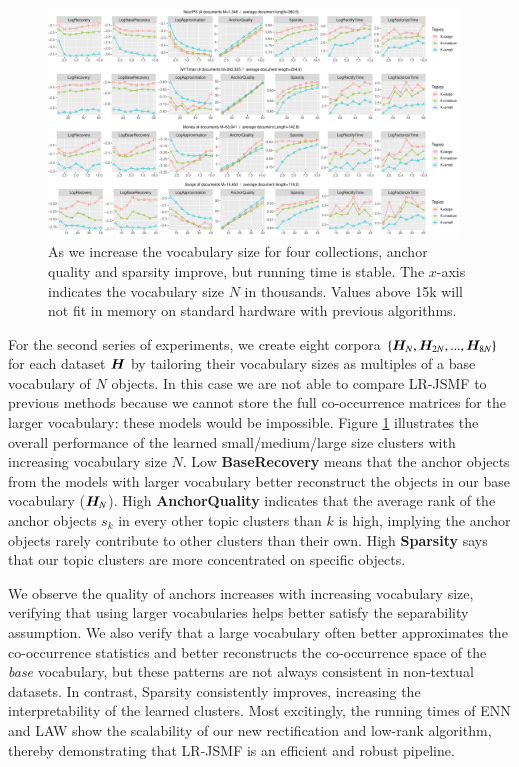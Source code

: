 \begin{figure}[ht]
 	\centering
	\includegraphics[width=0.97\textwidth, trim={1.0cm 1.0cm 1.0cm 0.0cm}]
	{./ch4/pics/real_TopicsPerVocabs_new-plain.pdf}
	\caption{As we increase the vocabulary size for four collections, anchor
	quality and sparsity improve, but running time is stable. The $x$-axis
	indicates the vocabulary size $N$ in thousands. Values above 15k will not fit
	in memory on standard hardware with previous algorithms.}
	\label{fig:results-vocabs}
\end{figure}

For the second series of experiments, 
we create eight corpora $\{\bm{H}_N, \bm{H}_{2N}, ..., \bm{H}_{8N}\}$ for each dataset
$\bm{H}$ by tailoring their vocabulary sizes as multiples of a base vocabulary of
$N$ objects. In this case we are not able to compare LR-JSMF to previous methods
because we cannot store the full co\hyp{}occurrence matrices for the larger
vocabulary: these models would be impossible. Figure \ref{fig:results-vocabs}
illustrates the overall performance of the learned small/medium/large size
clusters with increasing vocabulary size $N$. Low \textbf{BaseRecovery} means
that the anchor objects from the models with larger vocabulary better
reconstruct the objects in our base vocabulary ($\bm{H}_N$). High  
\textbf{AnchorQuality} indicates that the average rank of the anchor objects
$s_k$ in every other topic clusters than $k$ is high, implying the anchor
objects rarely contribute to other clusters than their own. High 
\textbf{Sparsity}  \cite{Hoyer2004} says that our topic clusters are more concentrated on specific objects.

We observe the quality of anchors increases with increasing vocabulary size,
verifying that using larger vocabularies helps better satisfy the separability
assumption. We also verify that a large vocabulary often better approximates the
co\hyp{}occurrence statistics and better reconstructs the co\hyp{}occurrence
space of the \textit{base} vocabulary, but these patterns are not always
consistent in non-textual datasets. In contrast, Sparsity consistently improves,
increasing the interpretability of the learned clusters. Most excitingly, the
running times of ENN and LAW show the scalability of our new rectification and
low-rank algorithm, thereby demonstrating that LR-JSMF is an efficient and
robust pipeline.

